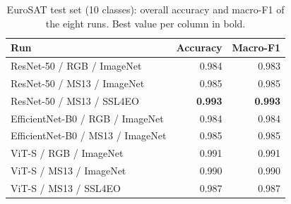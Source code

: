 \begin{table}[t]
\centering
\footnotesize
\caption{EuroSAT test set (10 classes): overall accuracy and macro-F1 of the eight runs. Best value per column in bold.}
\label{tab:eurosat}
\begin{tabular}{lrr}
\toprule
Run & Accuracy & Macro-F1 \\
\midrule
ResNet-50 / RGB / ImageNet & 0.984 & 0.983 \\
ResNet-50 / MS13 / ImageNet & 0.985 & 0.985 \\
ResNet-50 / MS13 / SSL4EO & \textbf{0.993} & \textbf{0.993} \\
EfficientNet-B0 / RGB / ImageNet & 0.984 & 0.984 \\
EfficientNet-B0 / MS13 / ImageNet & 0.985 & 0.985 \\
ViT-S / RGB / ImageNet & 0.991 & 0.991 \\
ViT-S / MS13 / ImageNet & 0.990 & 0.990 \\
ViT-S / MS13 / SSL4EO & 0.987 & 0.987 \\
\bottomrule
\end{tabular}
\end{table}
